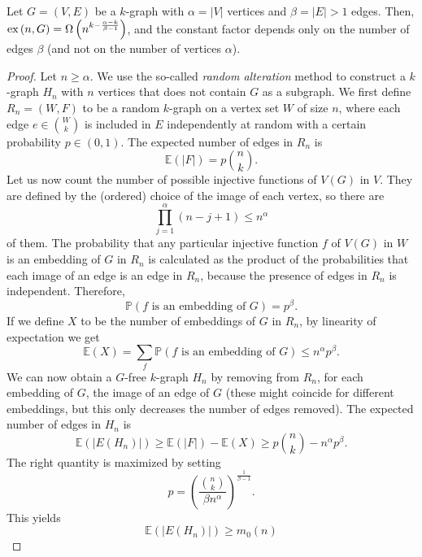\begin{proposition} \label{prop:probabilistic-lower-bound}
    Let $G = (V, E)$ be a $k$-graph with
    $\alpha = |V|$ vertices
    and $\beta = |E| > 1$ edges.
    Then, $\text{ex} \left( n, G \right) = \Omega\left(n^{k - \frac{\alpha - k}{\beta - 1}} \right)$, and the
    constant factor depends only on the number of edges $\beta$ (and not on the number of vertices $\alpha$).
    \begin{proof}
        Let $n \geq \alpha$.
        We use the so-called \emph{random alteration} method to construct a $k$-graph
        $H_n$ with $n$ vertices that does not contain $G$ as a subgraph.
        We first define $R_n = (W, F)$ to be a random $k$-graph on a vertex set $W$ of size $n$,
        where each edge $e \in \binom{W}{k}$ is included in $E$ independently at random
        with a certain probability $p \in (0, 1)$.
        The expected number of edges in $R_n$ is
        \[
            \mathbb{E}(|F|) = p \binom{n}{k}.
        \]
        Let us now count the number of possible injective functions of $V(G)$ in $V$.
        They are defined by the (ordered) choice of the image of each vertex, so there are
        \[
            \prod_{j=1}^{\alpha} (n - j + 1) \leq n^{\alpha}
        \]
        of them.
        The probability that any particular injective function $f$ of $V(G)$ in $W$ is an embedding of $G$ in $R_n$
        is calculated as the product of the probabilities that each image of an edge is an edge in $R_n$,
        because the presence of edges in $R_n$ is independent.
        Therefore,
        \[
            \mathbb{P}(f \text{ is an embedding of } G) = p^{\beta}.
        \]
        If we define $X$ to be the number of embeddings of $G$ in $R_n$, by linearity of expectation we get
        \[
            \mathbb{E}(X) = \sum_{f} \mathbb{P}(f \text{ is an embedding of } G) \leq n^{\alpha} p^{\beta}.
        \]
        We can now obtain a $G$-free $k$-graph $H_n$ by removing from $R_n$, for each embedding of $G$,
        the image of an edge of $G$ (these might coincide for different embeddings, but this only decreases the number of edges removed).
        The expected number of edges in $H_n$ is
        \[
            \mathbb{E}(|E(H_n)|) \geq \mathbb{E}(|F|) - \mathbb{E}(X) \geq
            p \binom{n}{k} - n^{\alpha} p^{\beta}.
        \]
        The right quantity is maximized by setting
        \[
            p = \left( \frac{\binom{n}{k}}{\beta n^{\alpha}} \right)^{\frac{1}{\beta-1}}.
        \]
        This yields
        \[
            \mathbb{E}(|E(H_n)|) \geq
            m_0(n)
\]
\end{proof}
\end{proposition}
